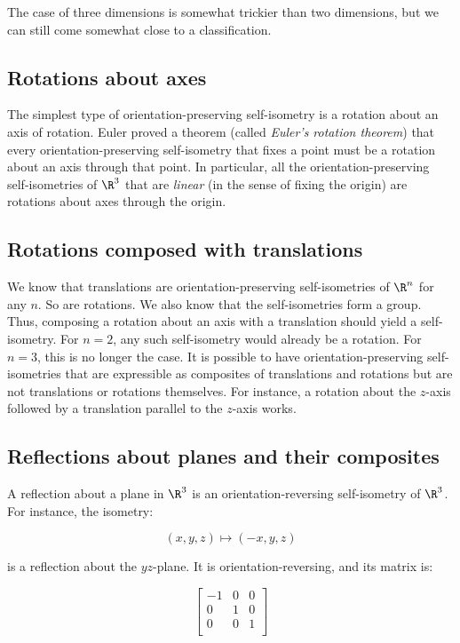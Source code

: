 \documentclass[10pt]{amsart}
\begin{document}
The case of three dimensions is somewhat trickier than two dimensions,
but we can still come somewhat close to a classification.

\subsection{Rotations about axes}

The simplest type of orientation-preserving self-isometry is a
rotation about an axis of rotation. Euler proved a theorem (called
{\em Euler's rotation theorem}) that every orientation-preserving
self-isometry that fixes a point must be a rotation about an axis
through that point. In particular, all the orientation-preserving
self-isometries of $\R^3$ that are {\em linear} (in the sense of
fixing the origin) are rotations about axes through the origin.

\subsection{Rotations composed with translations}

We know that translations are orientation-preserving self-isometries
of $\R^n$ for any $n$. So are rotations. We also know that the
self-isometries form a group. Thus, composing a rotation about an axis
with a translation should yield a self-isometry. For $n = 2$, any such
self-isometry would already be a rotation. For $n = 3$, this is no
longer the case. It is possible to have orientation-preserving
self-isometries that are expressible as composites of translations and
rotations but are not translations or rotations themselves. For
instance, a rotation about the $z$-axis followed by a translation
parallel to the $z$-axis works.

\subsection{Reflections about planes and their composites}

A reflection about a plane in $\R^3$ is an orientation-reversing
self-isometry of $\R^3$. For instance, the isometry:

$$(x,y,z) \mapsto (-x,y,z)$$

is a reflection about the $yz$-plane. It is orientation-reversing, and
its matrix is:

$$\left[\begin{matrix} -1 & 0 & 0 \\ 0 & 1 & 0 \\ 0 & 0 & 1 \\\end{matrix}\right]$$
\end{document}
